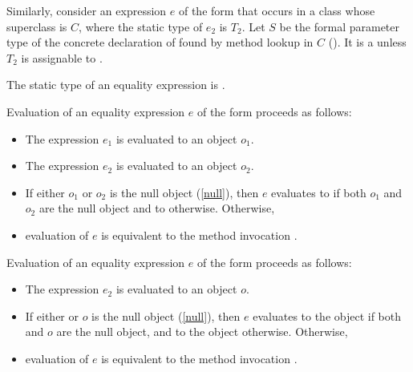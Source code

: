 \documentclass[makeidx]{article}
\begin{document}
\LMHash{}%
Similarly, consider an expression $e$ of the form
 that occurs in a class whose superclass is
$C$, where the static type of $e_2$ is $T_2$. Let $S$ be the formal
parameter type of the concrete declaration of 
found by method lookup in $C$
().
It is a  unless $T_2$ is assignable to
.


\LMHash{}%
The static type of an equality expression is .

\LMHash{}%
Evaluation of an equality expression $e$ of the form 
proceeds as follows:
\begin{itemize}
\item The expression $e_1$ is evaluated to an object $o_1$.
\item The expression $e_2$ is evaluated to an object $o_2$.
\item If either $o_1$ or $o_2$ is the null object (\ref{null}),
  then $e$ evaluates to \TRUE{} if both $o_1$ and $o_2$ are the null object
  and to \FALSE{} otherwise.
Otherwise,
\item evaluation of $e$ is equivalent to the method invocation
  .
\end{itemize}

\LMHash{}%
Evaluation of an equality expression $e$ of the form
proceeds as follows:
\begin{itemize}
\item
  The expression $e_2$ is evaluated to an object $o$.
\item
  If either \THIS{} or $o$ is the null object (\ref{null}),
  then $e$ evaluates to the \TRUE{} object
  if both \THIS{} and $o$ are the null object,
  and to the \FALSE{} object otherwise.
  Otherwise,
\item
  evaluation of $e$ is equivalent to the method invocation
  .
\end{itemize}
\end{document}
